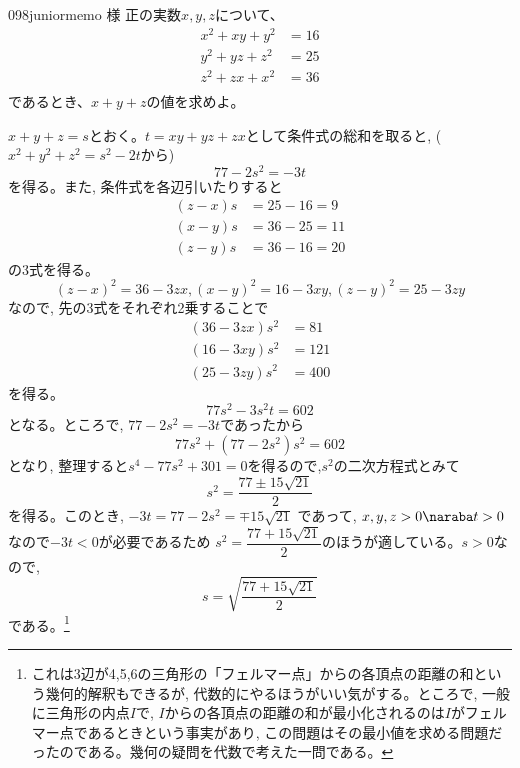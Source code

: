 \begin{prob}{098}{}{juniormemo 様}
 正の実数$x, y, z$について、
 \begin{align*}
  x^2+xy+y^2&=16 \\
  y^2+yz+z^2&=25 \\
  z^2+zx+x^2&=36 \\
 \end{align*}
 であるとき、$x+y+z$の値を求めよ。
\end{prob}
$x+y+z=s$とおく。$t=xy+yz+zx$として条件式の総和を取ると, ($x^2+y^2+z^2=s^2-2t$から)
\[77-2s^2=-3t\]
を得る。また, 条件式を各辺引いたりすると
\begin{align*}
 (z-x)s&=25-16=9 \\
 (x-y)s&=36-25=11 \\
 (z-y)s&=36-16=20
\end{align*}
の3式を得る。
\[(z-x)^2=36-3zx, (x-y)^2=16-3xy, (z-y)^2=25-3zy\]
なので, 先の3式をそれぞれ2乗することで
\begin{align*}
 (36-3zx)s^2&=81 \\
 (16-3xy)s^2&=121 \\
 (25-3zy)s^2&=400
\end{align*}
を得る。
\[77s^2-3s^2t=602\]
となる。ところで, $77-2s^2=-3t$であったから
\[77s^2+(77-2s^2)s^2=602\]
となり, 整理すると$s^4-77s^2+301=0$を得るので,$s^2$の二次方程式とみて
\[s^2=\dfrac{77\pm 15\sqrt{21}}{2}\]
を得る。このとき, $-3t=77-2s^2=\mp 15\sqrt{21}$ であって, $x,y,z>0\naraba t>0$なので$-3t<0$が必要であるため $s^2=\dfrac{77+15\sqrt{21}}{2}$のほうが適している。$s>0$なので, 
\[s=\sqrt{\dfrac{77+15\sqrt{21}}{2}}\]
である。\footnote{これは3辺が4,5,6の三角形の「フェルマー点」からの各頂点の距離の和という幾何的解釈もできるが, 代数的にやるほうがいい気がする。ところで, 一般に三角形の内点$I$で, $I$からの各頂点の距離の和が最小化されるのは$I$がフェルマー点であるときという事実があり, この問題はその最小値を求める問題だったのである。幾何の疑問を代数で考えた一問である。}

